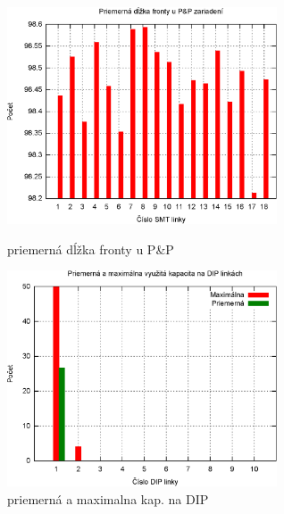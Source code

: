 \documentclass[12pt,a4paper,titlepage,final]{article}
\begin{document}
\begin{figure}[ht]
  \centering
  \begin{minipage}{0.45\linewidth}
  \centering
  \includegraphics[width=8cm]{doc/1_hist3.eps}
  \caption{priemerná dĺžka fronty u P\&P}
  \end{minipage}
  \quad
  \begin{minipage}{0.45\linewidth}
    \centering
    \includegraphics[width=8cm]{doc/1_hist4.eps}
    \caption{priemerná a maximalna kap. na DIP}
  \end{minipage}
\end{figure}

\newpage
\end{document}
